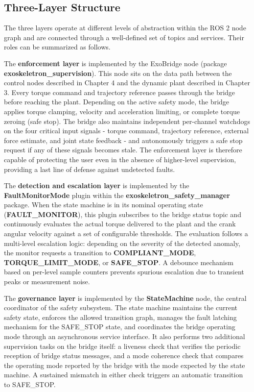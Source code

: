 \subsection{Three-Layer Structure}
The three layers operate at different levels of abstraction within the ROS 2 node graph and are connected through a well-defined set of topics and services. Their roles can be summarized as follows.

The \textbf{enforcement layer} is implemented by the ExoBridge node (package \textbf{exoskeletron\_supervision}). This node sits on the data path between the control nodes described in Chapter 4 and the dynamic plant described in Chapter 3. Every torque command and trajectory reference passes through the bridge before reaching the plant. Depending on the active safety mode, the bridge applies torque clamping, velocity and acceleration limiting, or complete torque zeroing (safe stop). The bridge also maintains independent per-channel watchdogs on the four critical input signals - torque command, trajectory reference, external force estimate, and joint state feedback - and autonomously triggers a safe stop request if any of these signals becomes stale. The enforcement layer is therefore capable of protecting the user even in the absence of higher-level supervision, providing a last line of defense against undetected faults.

The \textbf{detection and escalation layer} is implemented by the \textbf{FaultMonitorMode} plugin within the \textbf{exoskeletron\_safety\_manager} package. When the state machine is in its nominal operating state (\textbf{FAULT\_MONITOR}), this plugin subscribes to the bridge status topic and continuously evaluates the actual torque delivered to the plant and the crank angular velocity against a set of configurable thresholds. The evaluation follows a multi-level escalation logic: depending on the severity of the detected anomaly, the monitor requests a transition to \textbf{COMPLIANT\_MODE}, \textbf{TORQUE\_LIMIT\_MODE}, or \textbf{SAFE\_STOP}. A debounce mechanism based on per-level sample counters prevents spurious escalation due to transient peaks or measurement noise.

The \textbf{governance layer} is implemented by the \textbf{StateMachine} node, the central coordinator of the safety subsystem. The state machine maintains the current safety state, enforces the allowed transition graph, manages the fault latching mechanism for the SAFE\_STOP state, and coordinates the bridge operating mode through an asynchronous service interface. It also performs two additional supervision tasks on the bridge itself: a liveness check that verifies the periodic reception of bridge status messages, and a mode coherence check that compares the operating mode reported by the bridge with the mode expected by the state machine. A sustained mismatch in either check triggers an automatic transition to SAFE\_STOP.

